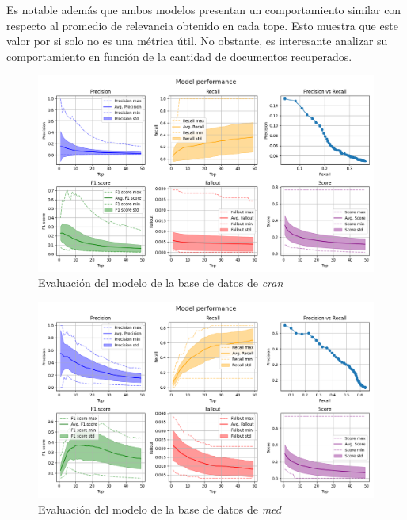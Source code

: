Es notable además que ambos modelos presentan un comportamiento similar con
respecto al promedio de relevancia obtenido en cada tope. Esto muestra que
este valor por si solo no es una métrica útil. No obstante, es interesante
analizar su comportamiento en función de la cantidad de documentos recuperados.

\begin{figure}[htb]%
	\begin{center}
		\includegraphics[width=1.0\textwidth]{./cran_eval.png}
	\end{center}
	\caption{Evaluación del modelo de la base de datos de \emph{cran}}
	\label{fig:cran-eval}
\end{figure}


\begin{figure}[htb]%
	\begin{center}
		\includegraphics[width=1.0\textwidth]{./med_eval.png}
	\end{center}
	\caption{Evaluación del modelo de la base de datos de \emph{med}}
	\label{fig:med-eval}
\end{figure}

